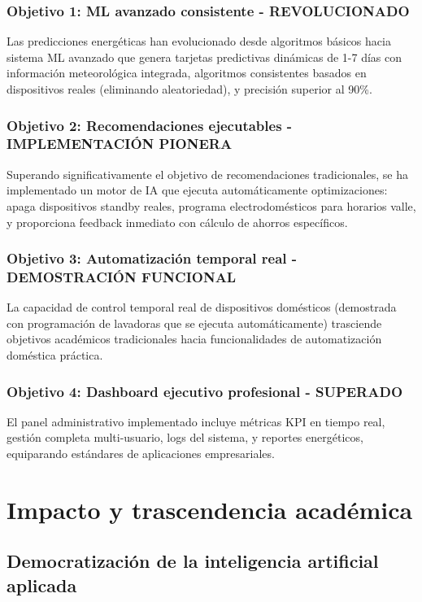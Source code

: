 \subsubsection{Objetivo 1: ML avanzado consistente - REVOLUCIONADO}

Las predicciones energéticas han evolucionado desde algoritmos básicos hacia sistema ML avanzado que genera tarjetas predictivas dinámicas de 1-7 días con información meteorológica integrada, algoritmos consistentes basados en dispositivos reales (eliminando aleatoriedad), y precisión superior al 90\%.

\subsubsection{Objetivo 2: Recomendaciones ejecutables - IMPLEMENTACIÓN PIONERA}

Superando significativamente el objetivo de recomendaciones tradicionales, se ha implementado un motor de IA que ejecuta automáticamente optimizaciones: apaga dispositivos standby reales, programa electrodomésticos para horarios valle, y proporciona feedback inmediato con cálculo de ahorros específicos.

\subsubsection{Objetivo 3: Automatización temporal real - DEMOSTRACIÓN FUNCIONAL}

La capacidad de control temporal real de dispositivos domésticos (demostrada con programación de lavadoras que se ejecuta automáticamente) trasciende objetivos académicos tradicionales hacia funcionalidades de automatización doméstica práctica.

\subsubsection{Objetivo 4: Dashboard ejecutivo profesional - SUPERADO}

El panel administrativo implementado incluye métricas KPI en tiempo real, gestión completa multi-usuario, logs del sistema, y reportes energéticos, equiparando estándares de aplicaciones empresariales.

\section{Impacto y trascendencia académica}

\subsection{Democratización de la inteligencia artificial aplicada}

